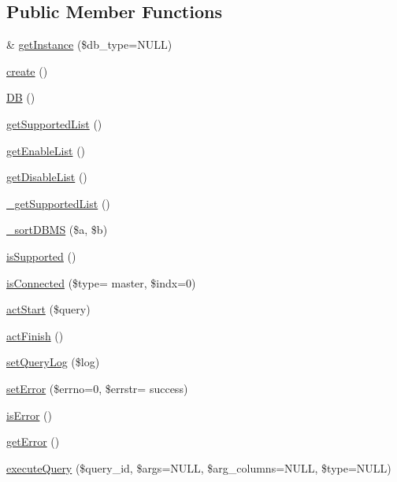 \subsection*{Public Member Functions}
\begin{DoxyCompactItemize}
\item 
\& \hyperlink{classDB_a16f4a668b6429b4b9af5132cbf885213}{get\+Instance} (\$db\+\_\+type=N\+U\+L\+L)
\item 
\hyperlink{classDB_aad22e845daa75ae9ca9b97f7e3a89749}{create} ()
\item 
\hyperlink{classDB_a29a603c52c10831cddee82518417f992}{D\+B} ()
\item 
\hyperlink{classDB_a82226ac3fc6365c0771b13e389d216cf}{get\+Supported\+List} ()
\item 
\hyperlink{classDB_a0031322267656e8f6bc7f811ca21198b}{get\+Enable\+List} ()
\item 
\hyperlink{classDB_a65508ca8b2bb4ebf6dbb570caf9c8e40}{get\+Disable\+List} ()
\item 
\hyperlink{classDB_a7b0d1af98d9f53968631ca789d6d755c}{\+\_\+get\+Supported\+List} ()
\item 
\hyperlink{classDB_ab0a6d97fa16de74b4d991c9a4d633718}{\+\_\+sort\+D\+B\+M\+S} (\$a, \$b)
\item 
\hyperlink{classDB_a7517481bc9d24ad659f8d347688e481b}{is\+Supported} ()
\item 
\hyperlink{classDB_a217cc2096613d1758a9851f1dd990d71}{is\+Connected} (\$type= \textquotesingle{}master\textquotesingle{}, \$indx=0)
\item 
\hyperlink{classDB_a51a1ba94763a8211495eac18d74c80bb}{act\+Start} (\$query)
\item 
\hyperlink{classDB_a79cad647912ef780e967819e6346a742}{act\+Finish} ()
\item 
\hyperlink{classDB_a0adb7f453d6e8ed2e491d6708be7f9ec}{set\+Query\+Log} (\$log)
\item 
\hyperlink{classDB_af2584546ee78d07a40cc16493f8797cc}{set\+Error} (\$errno=0, \$errstr= \textquotesingle{}success\textquotesingle{})
\item 
\hyperlink{classDB_ab1433763c6378f1085606424a1bfe27c}{is\+Error} ()
\item 
\hyperlink{classDB_a3956fe8725f824d8c0a4f3cba449d6df}{get\+Error} ()
\item 
\hyperlink{classDB_a4541040cbc3f33b059bafd66f8cb0ada}{execute\+Query} (\$query\+\_\+id, \$args=N\+U\+L\+L, \$arg\+\_\+columns=N\+U\+L\+L, \$type=N\+U\+L\+L)
\item 

\end{DoxyCompactItemize}
